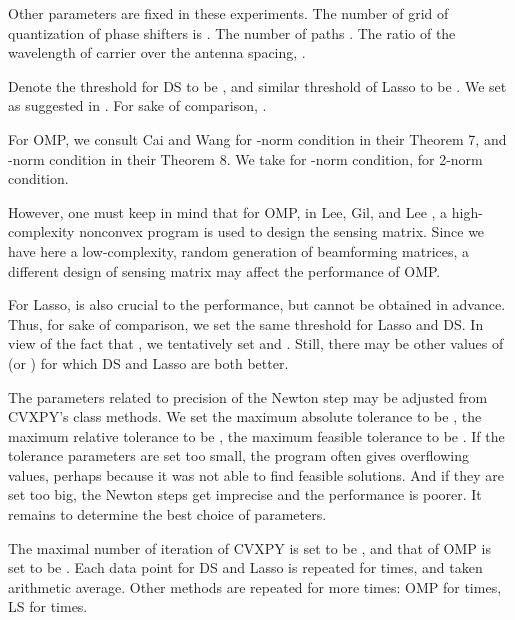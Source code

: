 Other parameters are fixed in these experiments.
The number of grid of quantization of phase shifters is .
The number of paths .
The ratio of the wavelength of carrier over the antenna spacing, .

Denote the threshold for DS to be , and similar threshold of Lasso to be .
We set  as suggested in \cite {CaT07}.
For sake of comparison, .

For OMP, we consult Cai and Wang \cite {CaW11} for -norm condition in their Theorem 7, and \m {\ell _\infty}-norm condition in their Theorem 8.
We take  for \m {\infty}-norm condition,  for 2-norm condition.

However, one must keep in mind that for OMP, in Lee, Gil, and Lee \cite {LGL16}, a high-complexity nonconvex program is used to design the sensing matrix.
Since we have here a low-complexity, random generation of beamforming matrices, a different design of sensing matrix may affect the performance of OMP.

For Lasso,  is also crucial to the performance, but cannot be obtained in advance.
Thus, for sake of comparison, we set the same threshold for Lasso and DS.
In view of the fact that , we tentatively set  and .
Still, there may be other values of \m {\g} (or \m {\l}) for which DS and Lasso are both better.

The parameters related to precision of the Newton step may be adjusted from CVXPY's class methods.
We set the maximum absolute tolerance to be ,
the maximum relative tolerance to be ,
the maximum feasible tolerance to be .
If the tolerance parameters are set too small, the program often gives overflowing values, perhaps because it was not able to find feasible solutions.
And if they are set too big, the Newton steps get imprecise and the performance is poorer.
It remains to determine the best choice of parameters.

The maximal number of iteration of CVXPY is set to be , and that of OMP is set to be .
Each data point for DS and Lasso is repeated for  times, and taken arithmetic average.
Other methods are repeated for more times: OMP for  times, LS for  times.

